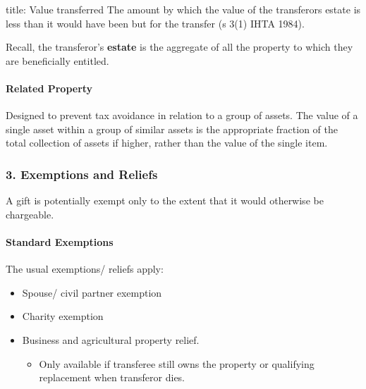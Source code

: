 \documentclass[
]{article}
\newenvironment{Shaded}{}{}
\newcommand{\NormalTok}[1]{#1}
\providecommand{\tightlist}{%
  \setlength{\itemsep}{0pt}\setlength{\parskip}{0pt}}
\begin{document}
\begin{Shaded}
\begin{Highlighting}[]
\NormalTok{title: Value transferred}
\NormalTok{The amount by which the value of the transferor\textquotesingle{}s estate is less than it would have been but for the transfer (s 3(1) IHTA 1984). }
\end{Highlighting}
\end{Shaded}

Recall, the transferor's \textbf{estate} is the aggregate of all the
property to which they are beneficially entitled.

\hypertarget{related-property}{%
\paragraph{Related Property}\label{related-property}}

Designed to prevent tax avoidance in relation to a group of assets. The
value of a single asset within a group of similar assets is the
appropriate fraction of the total collection of assets if higher, rather
than the value of the single item.

\hypertarget{exemptions-and-reliefs}{%
\subsubsection{3. Exemptions and Reliefs}\label{exemptions-and-reliefs}}

A gift is potentially exempt only to the extent that it would otherwise
be chargeable.

\hypertarget{standard-exemptions}{%
\paragraph{Standard Exemptions}\label{standard-exemptions}}

The usual exemptions/ reliefs apply:

\begin{itemize}
\tightlist
\item
  Spouse/ civil partner exemption
\item
  Charity exemption
\item
  Business and agricultural property relief.

  \begin{itemize}
  \tightlist
  \item
    Only available if transferee still owns the property or qualifying
    replacement when transferor dies.
  \end{itemize}
\end{itemize}
\end{document}
